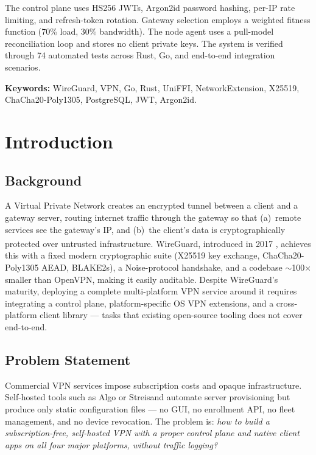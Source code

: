 \documentclass[12pt,a4paper]{report}
\newcommand{\wireguard}{WireGuard\textsuperscript{\textregistered}}
\begin{document}
The control plane uses HS256 JWTs, Argon2id password hashing, per-IP rate limiting, and refresh-token rotation. Gateway selection employs a weighted fitness function (70\% load, 30\% bandwidth). The node agent uses a pull-model reconciliation loop and stores no client private keys. The system is verified through 74 automated tests across Rust, Go, and end-to-end integration scenarios.

\noindent\textbf{Keywords:} WireGuard, VPN, Go, Rust, UniFFI, NetworkExtension, X25519, ChaCha20-Poly1305, PostgreSQL, JWT, Argon2id.

\tableofcontents
\listoffigures
\listoftables

\chapter{Introduction}

\section{Background}

A Virtual Private Network creates an encrypted tunnel between a client and a gateway server, routing internet traffic through the gateway so that (a)~remote services see the gateway's IP, and (b)~the client's data is cryptographically protected over untrusted infrastructure. \wireguard{}, introduced in 2017 \cite{donenfeld2017wireguard}, achieves this with a fixed modern cryptographic suite (X25519 key exchange, ChaCha20-Poly1305 AEAD, BLAKE2s), a Noise-protocol handshake, and a codebase $\sim$100$\times$ smaller than OpenVPN, making it easily auditable. Despite WireGuard's maturity, deploying a complete multi-platform VPN service around it requires integrating a control plane, platform-specific OS VPN extensions, and a cross-platform client library — tasks that existing open-source tooling does not cover end-to-end.

\section{Problem Statement}

Commercial VPN services impose subscription costs and opaque infrastructure. Self-hosted tools such as Algo or Streisand automate server provisioning but produce only static configuration files — no GUI, no enrollment API, no fleet management, and no device revocation. The problem is: \emph{how to build a subscription-free, self-hosted VPN with a proper control plane and native client apps on all four major platforms, without traffic logging?}
\end{document}
